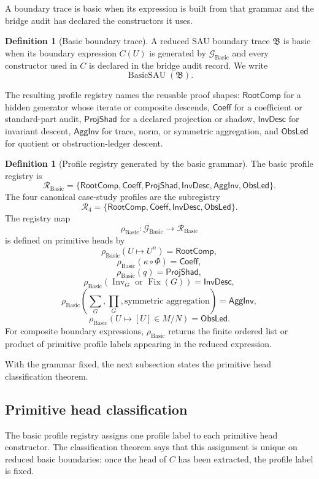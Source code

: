\documentclass[11pt]{article}
\newcommand{\RootComp}{\mathsf{RootComp}}
\newcommand{\Coeff}{\mathsf{Coeff}}
\newcommand{\InvDesc}{\mathsf{InvDesc}}
\newcommand{\AggInv}{\mathsf{AggInv}}
\newcommand{\ObsLed}{\mathsf{ObsLed}}
\newcommand{\ProjShad}{\mathsf{ProjShad}}
\newcommand{\Fix}{\operatorname{Fix}}
\newcommand{\Basic}{\operatorname{Basic}}
\newcommand{\Inv}{\operatorname{Inv}}
\newcommand{\BasicSAU}{\operatorname{BasicSAU}}
\theoremstyle{definition}
\newtheorem{definition}[theorem]{Definition}
\begin{document}
A boundary trace is basic when its expression is built from that grammar and the
bridge audit has declared the constructors it uses.

\begin{definition}[Basic boundary trace]
\label{def:sau-basic-boundary-trace}
A reduced SAU boundary trace \(\mathfrak B\) is basic when its boundary expression \(C(U)\) is generated by \(\mathcal G_{\Basic}\) and every constructor used in \(C\) is declared in the bridge audit record.  We write
\[
\BasicSAU(\mathfrak B).
\]
\end{definition}

The resulting profile registry names the reusable proof shapes: \(\RootComp\)
for a hidden generator whose iterate or composite descends, \(\Coeff\) for a
coefficient or standard-part audit, \(\ProjShad\) for a declared projection or
shadow, \(\InvDesc\) for invariant descent, \(\AggInv\) for trace, norm, or
symmetric aggregation, and \(\ObsLed\) for quotient or obstruction-ledger
descent.

\begin{definition}[Profile registry generated by the basic grammar]
\label{def:sau-basic-profile-registry}
The basic profile registry is
\[
\mathcal R_{\Basic}
=\{\RootComp,\Coeff,\ProjShad,\InvDesc,\AggInv,\ObsLed\}.
\]
The four canonical case-study profiles are the subregistry
\[
\mathcal R_{4}
=\{\RootComp,\Coeff,\InvDesc,\ObsLed\}.
\]
The registry map
\[
\rho_{\Basic}:\mathcal G_{\Basic}\longrightarrow\mathcal R_{\Basic}
\]
is defined on primitive heads by
\[
\rho_{\Basic}(U\mapsto U^n)=\RootComp,
\]
\[
\rho_{\Basic}(\kappa\circ\Phi)=\Coeff,
\]
\[
\rho_{\Basic}(q)=\ProjShad,
\]
\[
\rho_{\Basic}(\Inv_G\text{ or }\Fix(G))=\InvDesc,
\]
\[
\rho_{\Basic}(\sum_G,\prod_G,\text{symmetric aggregation})=\AggInv,
\]
\[
\rho_{\Basic}(U\mapsto[U]\in M/N)=\ObsLed.
\]
For composite boundary expressions, \(\rho_{\Basic}\) returns the finite ordered list or product of primitive profile labels appearing in the reduced expression.
\end{definition}

With the grammar fixed, the next subsection states the primitive head
classification theorem.

\subsection{Primitive head classification}
\label{subsec:classification-primitive-head}

The basic profile registry assigns one profile label to each primitive head
constructor.  The classification theorem says that this assignment is unique on
reduced basic boundaries: once the head of \(C\) has been extracted, the profile
label is fixed.
\end{document}
